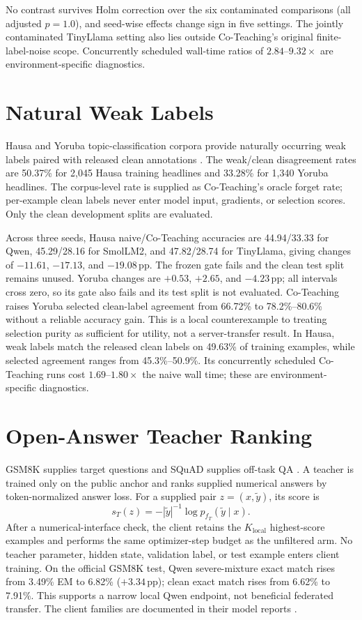 \documentclass[letterpaper]{article}
\newcommand{\pp}{\,\mathrm{pp}}
\begin{document}
No contrast survives Holm correction over the six contaminated comparisons
(all adjusted $p=1.0$), and seed-wise effects change sign in five settings.
The jointly contaminated TinyLlama setting also lies outside Co-Teaching's
original finite-label-noise scope.  Concurrently scheduled wall-time ratios of
$2.84$--$9.32\times$ are environment-specific diagnostics.

\section{Natural Weak Labels}
Hausa and Yoruba topic-classification corpora provide naturally occurring weak
labels paired with released clean annotations \cite{hedderich2020transfer}.
The weak/clean disagreement
rates are 50.37\% for 2,045 Hausa training headlines and 33.28\% for 1,340
Yoruba headlines.  The corpus-level rate is supplied as Co-Teaching's oracle
forget rate; per-example clean labels never enter model input, gradients, or
selection scores.  Only the clean development splits are evaluated.

Across three seeds, Hausa naive/Co-Teaching accuracies are 44.94/33.33 for
Qwen, 45.29/28.16 for SmolLM2, and 47.82/28.74 for TinyLlama, giving changes of
$-11.61$, $-17.13$, and $-19.08\pp$.  The frozen gate fails and the clean test
split remains unused.  Yoruba changes are $+0.53$, $+2.65$, and $-4.23\pp$;
all intervals cross zero, so its gate also fails and its test split is not
evaluated.  Co-Teaching raises Yoruba selected clean-label agreement from
66.72\% to 78.2\%--80.6\% without a reliable accuracy gain.  This is a local
counterexample to treating selection purity as sufficient for utility, not a
server-transfer result.  In Hausa, weak labels match the released clean labels
on 49.63\% of training examples, while selected agreement ranges from
45.3\%--50.9\%.  Its concurrently scheduled Co-Teaching runs cost
\(1.69\)--\(1.80\times\) the naive wall time; these are environment-specific
diagnostics.

\section{Open-Answer Teacher Ranking}
GSM8K supplies target questions and SQuAD supplies off-task QA
\cite{cobbe2021gsm8k,rajpurkar2016squad}.  A teacher is
trained only on the public anchor and ranks supplied numerical answers by
token-normalized answer loss.  For a supplied pair
\(z=(x,\widetilde y)\), its score is
\[
s_T(z)=-|\widetilde y|^{-1}\log p_{f_T}(\widetilde y\mid x).
\]
After a numerical-interface check, the client retains the \(K_{\mathrm{local}}\) highest-score
examples and performs the same optimizer-step budget as the unfiltered arm.
No teacher parameter, hidden state, validation label, or test example enters
client training.  On the official GSM8K test, Qwen severe-mixture
exact match rises from 3.49\% EM to 6.82\% ($+3.34\pp$); clean exact match rises
from 6.62\% to 7.91\%.  This supports a narrow local Qwen endpoint, not
beneficial federated transfer.  The client families are documented in their
model reports \cite{qwen2025technical,benallal2025smollm2,zhang2024tinyllama}.
\end{document}
